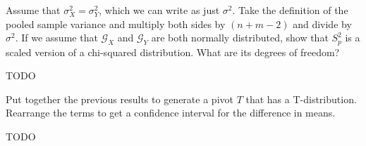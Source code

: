 Assume that $\sigma_X^2 = \sigma_Y^2$, which we can write as just $\sigma^2$.
Take the definition of the pooled sample variance and multiply both sides by
$(n + m - 2)$ and divide by $\sigma^2$. If we assume that $\mathcal{G}_X$ and
$\mathcal{G}_Y$ are both normally distributed, show that $S_p^2$ is a scaled
version of a chi-squared distribution. What are its degrees of freedom?


TODO


Put together the previous results to generate a pivot $T$ that has a T-distribution.
Rearrange the terms to get a confidence interval for the difference in means.


TODO